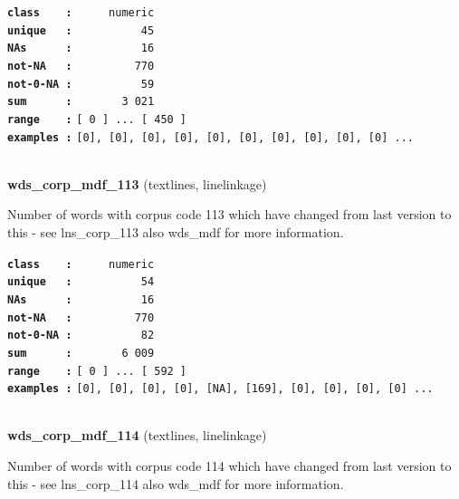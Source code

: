 \documentclass[]{article}
\begin{document}
\textbf{\texttt{class\ \ \ \ :}} \texttt{~~~~~numeric}\\
\textbf{\texttt{unique\ \ \ :}} \texttt{~~~~~~~~~~45}\\
\textbf{\texttt{NAs\ \ \ \ \ \ :}} \texttt{~~~~~~~~~~16}\\
\textbf{\texttt{not-NA\ \ \ :}} \texttt{~~~~~~~~~770}\\
\textbf{\texttt{not-0-NA\ :}} \texttt{~~~~~~~~~~59}\\
\textbf{\texttt{sum\ \ \ \ \ \ :}} \texttt{~~~~~~~3~021}\\
\textbf{\texttt{range\ \ \ \ :}}
\texttt{{[}\ 0\ {]}\ ...\ {[}\ 450\ {]}}\\
\textbf{\texttt{examples\ :}}
\texttt{{[}0{]},\ {[}0{]},\ {[}0{]},\ {[}0{]},\ {[}0{]},\ {[}0{]},\ {[}0{]},\ {[}0{]},\ {[}0{]},\ {[}0{]}\ ...}\\

~

\textbf{wds\_corp\_mdf\_113} (textlines, linelinkage)

Number of words with corpus code 113 which have changed from last
version to this - see lns\_corp\_113 also wds\_mdf for more information.

\textbf{\texttt{class\ \ \ \ :}} \texttt{~~~~~numeric}\\
\textbf{\texttt{unique\ \ \ :}} \texttt{~~~~~~~~~~54}\\
\textbf{\texttt{NAs\ \ \ \ \ \ :}} \texttt{~~~~~~~~~~16}\\
\textbf{\texttt{not-NA\ \ \ :}} \texttt{~~~~~~~~~770}\\
\textbf{\texttt{not-0-NA\ :}} \texttt{~~~~~~~~~~82}\\
\textbf{\texttt{sum\ \ \ \ \ \ :}} \texttt{~~~~~~~6~009}\\
\textbf{\texttt{range\ \ \ \ :}}
\texttt{{[}\ 0\ {]}\ ...\ {[}\ 592\ {]}}\\
\textbf{\texttt{examples\ :}}
\texttt{{[}0{]},\ {[}0{]},\ {[}0{]},\ {[}0{]},\ {[}NA{]},\ {[}169{]},\ {[}0{]},\ {[}0{]},\ {[}0{]},\ {[}0{]}\ ...}\\

~

\textbf{wds\_corp\_mdf\_114} (textlines, linelinkage)

Number of words with corpus code 114 which have changed from last
version to this - see lns\_corp\_114 also wds\_mdf for more information.
\end{document}

